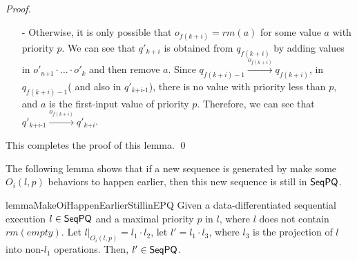\begin {proof}
\begin{itemize}
\begin{itemize}
    \item[-] Otherwise, it is only possible that $o_{f(k+i)} = \textit{rm}(a)$ for some value $a$ with priority $p$. We can see that $q'_{k+i}$ is obtained from $q_{f(k+i)}$ by adding values in $o'_{\textit{n+1}} \cdot \ldots \cdot o'_k$ and then remove $a$. Since $q_{f(k+i)-1} \xrightarrow{o_{f(k+i)}} q_{f(k+i)}$, in $q_{f(k+i)-1}$( and also in $q'_{\textit{k+i-1}}$), there is no value with priority less than $p$, and $a$ is the first-input value of priority $p$. Therefore, we can see that $q'_{\textit{k+i-1}} \xrightarrow{o_{f(k+i)}} q'_{\textit{k+i}}$.
    \end{itemize}
\end{itemize}

This completes the proof of this lemma. \qed
\end {proof}



The following lemma shows that if a new sequence is generated by make some $O_i(l,p)$ behaviors to happen earlier, then this new sequence is still in $\mathsf{SeqPQ}$.

\begin{restatable}{lemma}{MakeOiHappenEarlierStillinEPQ}
\label{lemma:make Oi happen earlier still in EPQ}
Given a data-differentiated sequential execution $l \in \mathsf{SeqPQ}$ and a maximal priority $p$ in $l$, where $l$ does not contain $\textit{rm}(\textit{empty})$. Let $l \vert_{ O_i(l,p) } = l_1 \cdot l_2$, let $l' = l_1 \cdot l_3$, where $l_3$ is the projection of $l$ into non-$l_1$ operations. Then, $l' \in \mathsf{SeqPQ}$.
\end{restatable}

